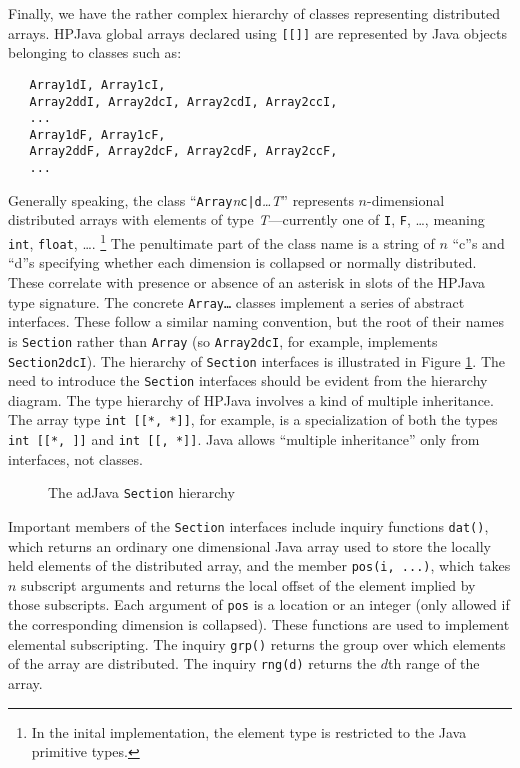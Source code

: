 Finally, we have the rather complex hierarchy of classes representing
distributed arrays.  HPJava global arrays declared using
\texttt{[[]]} are represented by Java objects belonging to classes
such as:
\begin{small}
\begin{verbatim}
   Array1dI, Array1cI,
   Array2ddI, Array2dcI, Array2cdI, Array2ccI,
   ...
   Array1dF, Array1cF,
   Array2ddF, Array2dcF, Array2cdF, Array2ccF,
   ...
\end{verbatim}
\end{small}
Generally speaking, the class
``\texttt{Array}\textit{n}\texttt{c|d}\textit{{\ldots}T}''
represents $n$-dimensional distributed arrays with elements of type
{\em T}---currently one of {\tt I}, {\tt F}, \ldots, meaning {\tt int},
{\tt float}, \ldots. \footnote{In the inital implementation, the element
  type is restricted to the Java primitive types.}  The penultimate
part of the class name is a string of $n$ ``c''s and ``d''s specifying
whether each dimension is collapsed or normally distributed.  These
correlate with presence or absence of an asterisk in slots of the
HPJava type signature.  The concrete {\tt Array\ldots} classes
implement a series of abstract interfaces.  These follow a similar
naming convention, but the root of their names is {\tt Section} rather
than {\tt Array} (so {\tt Array2dcI}, for example, implements {\tt
Section2dcI}).  The hierarchy of {\tt Section} interfaces is
illustrated in Figure \ref{fig:arrays}.
The need to introduce the {\tt Section} interfaces should be evident
from the hierarchy diagram.  The type hierarchy of HPJava involves a
kind of multiple inheritance.  The array type {\tt int [[*, *]]}, for
example, is a specialization of both the types {\tt int [[*, ]]}
and {\tt int [[, *]]}.  Java allows ``multiple inheritance'' only from
interfaces, not classes.

\begin{figure}[tbp]
  \begin{center}
    \leavevmode
    \caption{The adJava {\tt Section} hierarchy}
    \label{fig:arrays}
  \end{center}
\end{figure}

Important members of the {\tt Section} interfaces include
inquiry functions {\tt dat()}, which returns an ordinary one
dimensional Java array used to store the locally held elements of the
distributed array, and the member {\tt pos(i, ...)}, which takes $n$
subscript arguments and returns the local offset of the element implied by
those subscripts.  Each argument of {\tt pos} is a location or an
integer (only allowed if the corresponding dimension is collapsed).
These functions are used to implement elemental subscripting.
The inquiry {\tt grp()} returns the group over which
elements of the array are distributed.  The inquiry {\tt rng(d)}
returns the $d$th range of the array.

